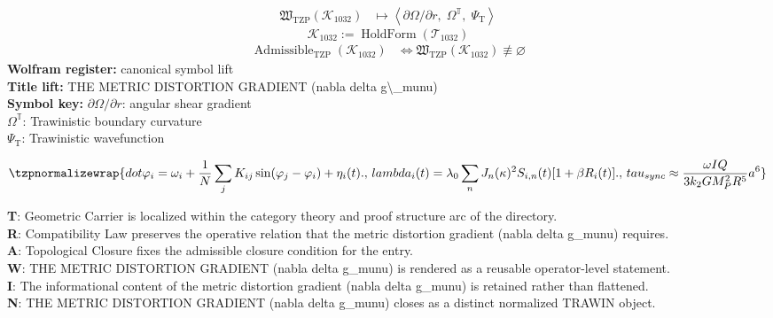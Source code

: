 \noindent
\begin{minipage}[t]{0.48\linewidth}
\begingroup
\small
\[
\begin{aligned}
\mathfrak{W}_{\mathrm{TZP}}\!\left(\mathcal{K}_{1032}\right)
&\longmapsto
\left\langle \partial\Omega/\partial r,\; \Omega^{\mathbb{T}},\; \Psi_{\mathrm{T}} \right\rangle
\end{aligned}
\]
\[
\mathcal{K}_{1032}
:=
\operatorname{HoldForm}\!\left(\mathcal{T}_{1032}\right)
\]
\[
\begin{aligned}
\operatorname{Admissible}_{\mathrm{TZP}}\!\left(\mathcal{K}_{1032}\right)
&\Longleftrightarrow
\mathfrak{W}_{\mathrm{TZP}}\!\left(\mathcal{K}_{1032}\right)\not\equiv\varnothing
\end{aligned}
\]
\textbf{Wolfram register:} canonical symbol lift\\
\textbf{Title lift:} THE METRIC DISTORTION GRADIENT (nabla delta g\textbackslash{}\_munu)\\
\textbf{Symbol key:} \(\partial\Omega/\partial r\): angular shear gradient\\ \(\Omega^{\mathbb{T}}\): Trawinistic boundary curvature\\ \(\Psi_{\mathrm{T}}\): Trawinistic wavefunction
\par
\endgroup
\end{minipage}\hfill
\begin{minipage}[t]{0.48\linewidth}
\[
\tzpnormalizewrap{dot\varphi_i = \omega_i + \frac{1}{N}\sum_j K_{ij}\sin(\varphi_j-\varphi_i) + \eta_i(t).,\,lambda_i(t) = \lambda_0 \sum_n J_n(\kappa)^2 S_{i,n}(t) [1+\beta R_i(t)].,\,tau_{sync} \approx \frac{\omega I Q}{3 k_2 G M_P^2 R^5} a^6}
\]

\small
\textbf{T}: Geometric Carrier is localized within the category theory and proof structure arc of the directory.\\
\textbf{R}: Compatibility Law preserves the operative relation that the metric distortion gradient (nabla delta g\_munu) requires.\\
\textbf{A}: Topological Closure fixes the admissible closure condition for the entry.\\
\textbf{W}: THE METRIC DISTORTION GRADIENT (nabla delta g\_munu) is rendered as a reusable operator-level statement.\\
\textbf{I}: The informational content of the metric distortion gradient (nabla delta g\_munu) is retained rather than flattened.\\
\textbf{N}: THE METRIC DISTORTION GRADIENT (nabla delta g\_munu) closes as a distinct normalized TRAWIN object.
\normalsize
\end{minipage}

